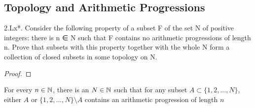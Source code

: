 \subsection{Topology and Arithmetic Progressions}

\begin{majorEx}
2.Lx*. Consider the following property of a subset F of the set N of positive
integers: there is n ∈ N such that F contains no arithmetic progressions of
length n. Prove that subsets with this property together with the whole N
form a collection of closed subsets in some topology on N.
\end{majorEx}
\begin{proof}
\end{proof}


\begin{majorEx}
  For every $n \in \mathbb{N}$, there is an $N \in \mathbb{N}$ such that for any
  subset $A \subset \{1,2,...,N\}$, either $A$ or $\{1,2,...,N\}
  \setminus A$ contains an arithmetic progression of length $n$
\end{majorEx}

